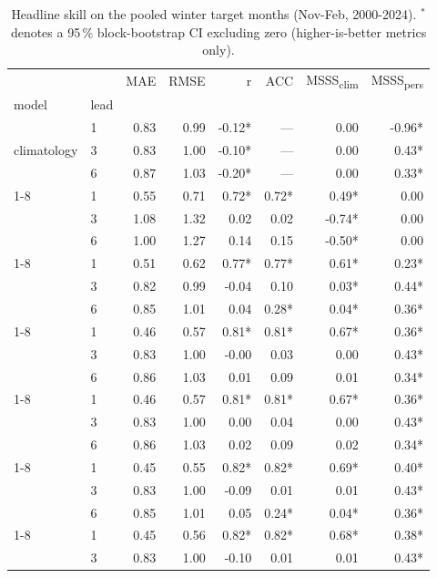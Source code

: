 \begin{table}
\caption{Headline skill on the pooled winter target months (Nov-Feb, 2000-2024). $^*$ denotes a 95\,\% block-bootstrap CI excluding zero (higher-is-better metrics only).}
\label{tab:headline_skill}
\begin{tabular}{llrrrrrr}
\toprule
 &  & MAE & RMSE & r & ACC & MSSS\textsubscript{clim} & MSSS\textsubscript{pers} \\
model & lead &  &  &  &  &  &  \\
\midrule
\multirow[t]{3}{*}{climatology} & 1 & 0.83 & 0.99 & -0.12* & --- & 0.00 & -0.96* \\
 & 3 & 0.83 & 1.00 & -0.10* & --- & 0.00 & 0.43* \\
 & 6 & 0.87 & 1.03 & -0.20* & --- & 0.00 & 0.33* \\
\cline{1-8}
\multirow[t]{3}{*}{persistence} & 1 & 0.55 & 0.71 & 0.72* & 0.72* & 0.49* & 0.00 \\
 & 3 & 1.08 & 1.32 & 0.02 & 0.02 & -0.74* & 0.00 \\
 & 6 & 1.00 & 1.27 & 0.14 & 0.15 & -0.50* & 0.00 \\
\cline{1-8}
\multirow[t]{3}{*}{ar} & 1 & 0.51 & 0.62 & 0.77* & 0.77* & 0.61* & 0.23* \\
 & 3 & 0.82 & 0.99 & -0.04 & 0.10 & 0.03* & 0.44* \\
 & 6 & 0.85 & 1.01 & 0.04 & 0.28* & 0.04* & 0.36* \\
\cline{1-8}
\multirow[t]{3}{*}{ols} & 1 & 0.46 & 0.57 & 0.81* & 0.81* & 0.67* & 0.36* \\
 & 3 & 0.83 & 1.00 & -0.00 & 0.03 & 0.00 & 0.43* \\
 & 6 & 0.86 & 1.03 & 0.01 & 0.09 & 0.01 & 0.34* \\
\cline{1-8}
\multirow[t]{3}{*}{ridge} & 1 & 0.46 & 0.57 & 0.81* & 0.81* & 0.67* & 0.36* \\
 & 3 & 0.83 & 1.00 & 0.00 & 0.04 & 0.00 & 0.43* \\
 & 6 & 0.86 & 1.03 & 0.02 & 0.09 & 0.02 & 0.34* \\
\cline{1-8}
\multirow[t]{3}{*}{lasso} & 1 & 0.45 & 0.55 & 0.82* & 0.82* & 0.69* & 0.40* \\
 & 3 & 0.83 & 1.00 & -0.09 & 0.01 & 0.01 & 0.43* \\
 & 6 & 0.85 & 1.01 & 0.05 & 0.24* & 0.04* & 0.36* \\
\cline{1-8}
\multirow[t]{3}{*}{elasticnet} & 1 & 0.45 & 0.56 & 0.82* & 0.82* & 0.68* & 0.38* \\
 & 3 & 0.83 & 1.00 & -0.10 & 0.01 & 0.01 & 0.43* \\

\end{tabular}
\end{table}

